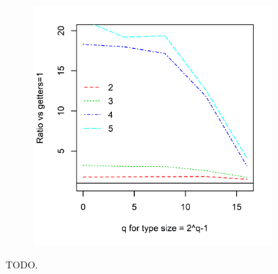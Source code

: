\begin{figure}
{\begin{subfigure}[b]{0.63\textwidth}
			\includegraphics[width=\textwidth]{experiments/simo_copy_1.png}
			\caption{}
			\label{fig:simo_copy_1}
		\end{subfigure}%
	}
	\caption[TODO]{TODO.}
	\label{fig:simo_copy}
\end{figure}

